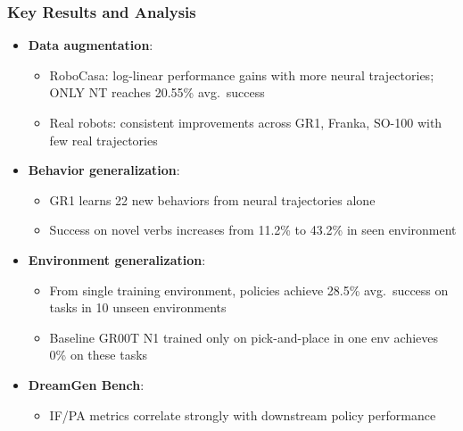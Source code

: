 \documentclass{beamer}
\begin{document}
\begin{frame}
  \frametitle{Key Results and Analysis}
  \small
  \begin{itemize}
    \item \textbf{Data augmentation}:
      \begin{itemize}
        \item RoboCasa: log-linear performance gains with more neural trajectories; ONLY NT reaches 20.55\% avg.\ success
        \item Real robots: consistent improvements across GR1, Franka, SO-100 with few real trajectories
      \end{itemize}
    \item \textbf{Behavior generalization}:
      \begin{itemize}
        \item GR1 learns 22 new behaviors from neural trajectories alone
        \item Success on novel verbs increases from 11.2\% to 43.2\% in seen environment
      \end{itemize}
    \item \textbf{Environment generalization}:
      \begin{itemize}
        \item From single training environment, policies achieve 28.5\% avg.\ success on tasks in 10 unseen environments
        \item Baseline GR00T N1 trained only on pick-and-place in one env achieves 0\% on these tasks
      \end{itemize}
    \item \textbf{DreamGen Bench}:
      \begin{itemize}
        \item IF/PA metrics correlate strongly with downstream policy performance
      \end{itemize}
  \end{itemize}
\end{frame}
\end{document}
